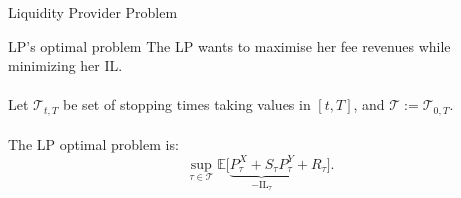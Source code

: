 \documentclass[10pt]{beamer}
\newcommand{\Tc}{{\mathcal T}}
\begin{document}
\begin{frame}{Liquidity Provider Problem}

\begin{block}{LP's optimal problem}
The LP wants to maximise her fee revenues while minimizing her IL.\\ \quad \\
Let $\Tc_{t,T}$ be set of stopping times taking values in $[t,T]$, and $\Tc := \Tc_{0,T}$. \\ \quad \\
The LP optimal problem is: \\
$$\sup_{\tau \in \mathcal{T}} \mathbb{E}\Big[\underbrace{P^X_\tau + S_\tau P^Y_\tau}_{-\text{IL}_\tau} + R_\tau \Big].$$
\end{block}
\end{frame}
\end{document}
